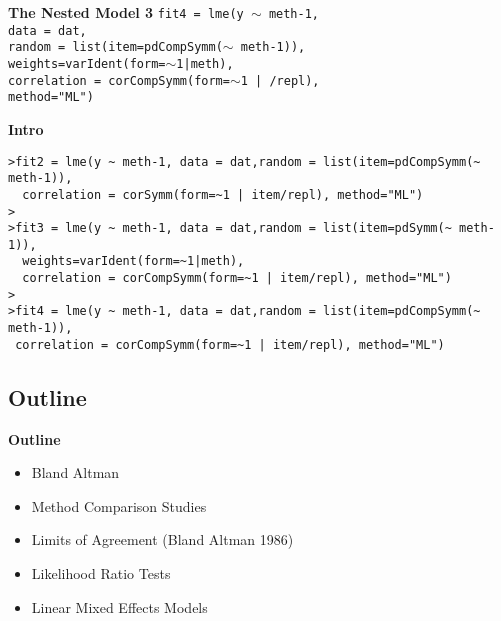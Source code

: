 \documentclass[compress]{beamer}        %
\makeatletter
\newcommand{\tcb}{\textcolor{beamer@blendedblue}}
\makeatother
\begin{document}
\begin{frame}[fragile]{\bf \tcb{The Nested Model 3}}
\texttt{fit4 = lme(y $\sim$ meth-1,\\
   \hspace{0.6cm} data = dat,\\
   \hspace{0.6cm} random = list(item=\tcb{pdCompSymm}($\sim$ meth-1)), \\
   \hspace{0.6cm} weights=varIdent(form=$\sim$1|meth),\\
   \hspace{0.6cm} correlation = \tcb{corCompSymm}(form=$\sim$1 | /repl),\\
   \hspace{0.6cm} method="ML")}
\end{frame}

\begin{frame}[fragile]{\bf \tcb{Intro}}
\begin{verbatim}
>fit2 = lme(y ~ meth-1, data = dat,random = list(item=pdCompSymm(~ meth-1)),
  correlation = corSymm(form=~1 | item/repl), method="ML")
>
>fit3 = lme(y ~ meth-1, data = dat,random = list(item=pdSymm(~ meth-1)),
  weights=varIdent(form=~1|meth),
  correlation = corCompSymm(form=~1 | item/repl), method="ML")
>
>fit4 = lme(y ~ meth-1, data = dat,random = list(item=pdCompSymm(~ meth-1)),
 correlation = corCompSymm(form=~1 | item/repl), method="ML")

\end{verbatim}
\end{frame}

\subsection{Outline}
\begin{frame}{\bf \tcb{Outline}}
\begin{itemize}\itemsep0.7cm
\item Bland Altman
\item Method Comparison Studies
\item Limits of Agreement (Bland Altman 1986)
\item Likelihood Ratio Tests
\item Linear Mixed Effects Models
\end{itemize}
\end{frame}
\end{document}
